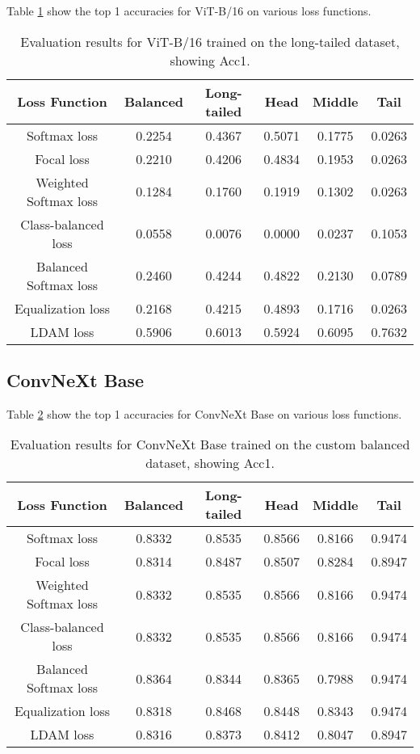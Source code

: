 Table \ref{tab:vit_lt_acc1} show the top 1 accuracies for ViT-B/16 on various loss functions.

\begin{table}[H]
    \centering
    \begin{tabular}{cccccc}
        \toprule
        Loss Function & Balanced & Long-tailed & Head & Middle & Tail \\ 
        \midrule
        Softmax loss   & 0.2254 & 0.4367 & 0.5071 & 0.1775 & 0.0263 \\
        Focal loss   & 0.2210 & 0.4206 & 0.4834 & 0.1953 & 0.0263 \\
        Weighted Softmax loss   & 0.1284 & 0.1760 & 0.1919 & 0.1302 & 0.0263 \\
        Class-balanced loss   & 0.0558 & 0.0076 & 0.0000 & 0.0237 & 0.1053 \\
        Balanced Softmax loss   & 0.2460 & 0.4244 & 0.4822 &  0.2130 & 0.0789 \\
        Equalization loss   & 0.2168 & 0.4215 & 0.4893 & 0.1716 & 0.0263 \\
        LDAM loss   & 0.5906 & 0.6013 & 0.5924 & 0.6095 & 0.7632 \\
        \bottomrule
    \end{tabular}
    \caption{Evaluation results for ViT-B/16 trained on the long-tailed dataset, showing Acc1.}
    \label{tab:vit_lt_acc1}
\end{table}

\subsection{ConvNeXt Base}

Table \ref{tab:conv_bal_acc1_1} show the top 1 accuracies for ConvNeXt Base on various loss functions.

\begin{table}[h!]
    \centering
    \begin{tabular}{cccccc}
        \toprule
        Loss Function & Balanced & Long-tailed & Head & Middle & Tail \\ 
        \midrule
        Softmax loss   & 0.8332 & 0.8535 & 0.8566 & 0.8166 & 0.9474 \\
        Focal loss   & 0.8314 & 0.8487 & 0.8507 & 0.8284 & 0.8947 \\
        Weighted Softmax loss   & 0.8332 & 0.8535 & 0.8566 &  0.8166 & 0.9474 \\
        Class-balanced loss   & 0.8332 & 0.8535 & 0.8566 & 0.8166 & 0.9474 \\
        Balanced Softmax loss   & 0.8364 & 0.8344 & 0.8365 & 0.7988 & 0.9474 \\
        Equalization loss   & 0.8318 & 0.8468 & 0.8448 & 0.8343 & 0.9474 \\
        LDAM loss   & 0.8316 & 0.8373 & 0.8412 & 0.8047 & 0.8947 \\
        \bottomrule
    \end{tabular}
    \caption{Evaluation results for ConvNeXt Base trained on the custom balanced dataset, showing Acc1.}
    \label{tab:conv_bal_acc1_1}
\end{table}

